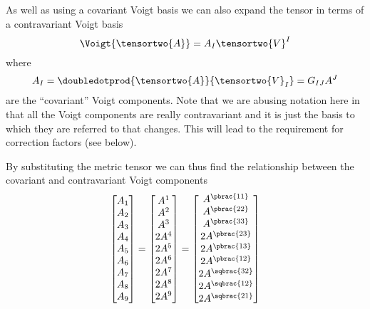 As well as using a covariant Voigt basis we can also expand the tensor in terms of a contravariant Voigt basis \ie
\begin{equation}
  \Voigt{\tensortwo{A}}=A_{I}\tensortwo{V}^{I}
\end{equation}
where
\begin{equation}
  A_{I}=\doubledotprod{\tensortwo{A}}{\tensortwo{V}_{I}}=G_{IJ}A^{J}
\end{equation}
are the ``covariant'' Voigt components. Note that we are abusing
notation here in that all the Voigt components are really
contravariant and it is just the basis to which they are referred to
that changes. This will lead to the requirement for correction factors
(see below).

By substituting the metric tensor we can thus find the relationship between the covariant and contravariant Voigt components \ie
\begin{equation}
  \begin{bmatrix}
    A_{1} \\
    A_{2} \\
    A_{3} \\
    A_{4} \\
    A_{5} \\
    A_{6} \\
    A_{7} \\
    A_{8} \\
    A_{9}
  \end{bmatrix} = \begin{bmatrix}
    A^{1} \\
    A^{2} \\
    A^{3} \\
    2A^{4} \\
    2A^{5} \\
    2A^{6} \\
    2A^{7} \\
    2A^{8} \\
    2A^{9}
  \end{bmatrix} = \begin{bmatrix}
    A^{\pbrac{11}} \\
    A^{\pbrac{22}} \\
    A^{\pbrac{33}} \\
    2A^{\pbrac{23}} \\
    2A^{\pbrac{13}} \\
    2A^{\pbrac{12}} \\
    2A^{\sqbrac{32}} \\
    2A^{\sqbrac{12}} \\
    2A^{\sqbrac{21}}
  \end{bmatrix}
\end{equation}

